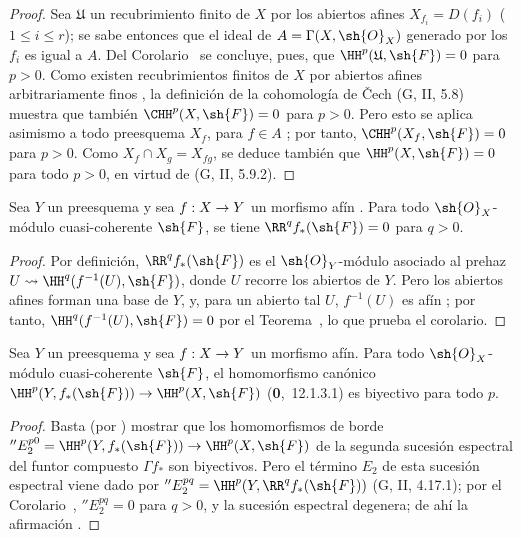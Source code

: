 \documentclass[oneside]{amsart}
\makeatletter
\renewcommand{\leq}{\leqslant}
\newcommand{\ega@arrow}[2]{\mathchoice{#1}{#2}{#2}{#2}}
\renewcommand{\to}{\ega@arrow{\longrightarrow}{\rightarrow}}
\let\EGAOriginalLabel\label
\renewcommand{\label}[1]{\phantomsection\EGAOriginalLabel{#1}}
\makeatother
\begin{document}
\begin{proof}
Sea $\mathfrak{U}$ un recubrimiento finito de $X$ por los abiertos afines $X_{f_i}=D(f_i)$ ($1\leq i\leq r$); se sabe entonces que el ideal de $A=\Gamma(X,\sh{O}_X)$ generado por los $f_i$ es igual a $A$.
Del Corolario~ se concluye, pues, que $\HH^p(\mathfrak{U},\sh{F})=0$ para $p>0$.
Como existen recubrimientos finitos de $X$ por abiertos afines arbitrariamente finos , la definición de la cohomología de \v Cech (G, II, 5.8) muestra que también $\CHH^p(X,\sh{F})=0$ para $p>0$.
Pero esto se aplica asimismo a todo preesquema $X_f$, para $f\in A$ ; por tanto, $\CHH^p(X_f,\sh{F})=0$ para $p>0$.
Como $X_f\cap X_g=X_{fg}$, se deduce también que $\HH^p(X,\sh{F})=0$ para todo $p>0$, en virtud de (G, II, 5.9.2).
\end{proof}

\begin{corollary}[1.3.2]
\label{III.1.3.2}
Sea $Y$ un preesquema y sea $f:X\to Y$ un morfismo afín .
Para todo $\sh{O}_X$-módulo cuasi-coherente $\sh{F}$, se tiene $\RR^q f_*(\sh{F})=0$ para $q>0$.
\end{corollary}

\begin{proof}
Por definición, $\RR^q f_*(\sh{F})$ es el $\sh{O}_Y$-módulo asociado al prehaz $U\leadsto\HH^q(f^{-1}(U),\sh{F})$, donde $U$ recorre los abiertos de $Y$.
Pero los abiertos afines forman una base de $Y$, y, para un abierto tal $U$, $f^{-1}(U)$ es afín ; por tanto, $\HH^q(f^{-1}(U),\sh{F})=0$ por el Teorema~, lo que prueba el corolario.
\end{proof}

\begin{corollary}[1.3.3]
\label{III.1.3.3}
Sea $Y$ un preesquema y sea $f:X\to Y$ un morfismo afín.
Para todo $\sh{O}_X$-módulo cuasi-coherente $\sh{F}$, el homomorfismo canónico $\HH^p(Y,f_*(\sh{F}))\to\HH^p(X,\sh{F})$ \textup{(\textbf{0},~12.1.3.1)} es biyectivo para todo $p$.
\end{corollary}

\begin{proof}
Basta (por ) mostrar que los homomorfismos de borde $''E_2^{p0}=\HH^p(Y,f_*(\sh{F}))\to\HH^p(X,\sh{F})$ de la segunda sucesión espectral del funtor compuesto $\Gamma f_*$ son biyectivos.
Pero el término $E_2$ de esta sucesión espectral viene dado por $''E_2^{pq}=\HH^p(Y,\RR^q f_*(\sh{F}))$ (G, II, 4.17.1); por el Corolario~, $''E_2^{pq}=0$ para $q>0$, y la sucesión espectral degenera; de ahí la afirmación .
\end{proof}
\end{document}
